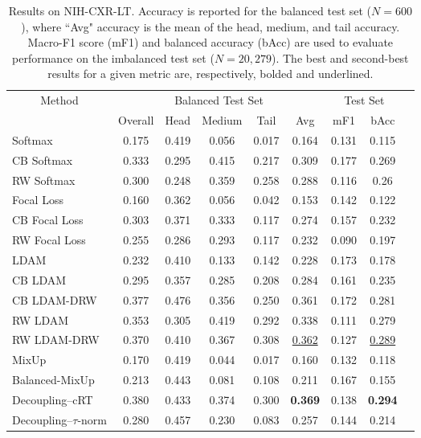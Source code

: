 \documentclass[runningheads]{llncs}
\begin{document}
\begin{table}[!hb]
    \centering
     \vspace{-1em}
	\renewcommand{\arraystretch}{1.1}
    \caption{Results on NIH-CXR-LT. Accuracy is reported for the balanced test set ($N=600$), where ``Avg" accuracy is the mean of the head, medium, and tail accuracy. Macro-F1 score (mF1) and balanced accuracy (bAcc) are used to evaluate performance on the imbalanced test set ($N=20,279$). The best and second-best results for a given metric are, respectively, bolded and underlined.}
    \begin{tabular}{@{}lcccccccc@{}}
        \toprule
        \multicolumn{1}{c}{Method} & \multicolumn{5}{c}{Balanced Test Set} & \multicolumn{2}{c}{Test Set} \\
        \cmidrule(lr){2-6} \cmidrule(lr){7-8}
         & Overall & Head & Medium & Tail & Avg & mF1 & bAcc \\
\midrule
        Softmax & 0.175 & 0.419 & 0.056 & 0.017 & 0.164 & 0.131 & 0.115 \\
        CB Softmax & 0.333 & 0.295 & 0.415 & 0.217 & 0.309 & 0.177 & 0.269 \\
        RW Softmax & 0.300 & 0.248 & 0.359 & 0.258 & 0.288 & 0.116 & 0.26 \\
        Focal Loss & 0.160 & 0.362 & 0.056 & 0.042 & 0.153 & 0.142 & 0.122 \\
        CB Focal Loss & 0.303 & 0.371 & 0.333 & 0.117 & 0.274 & 0.157 & 0.232 \\
        RW Focal Loss & 0.255 & 0.286 & 0.293 & 0.117 & 0.232 & 0.090 & 0.197 \\
        LDAM & 0.232 & 0.410 & 0.133 & 0.142 & 0.228 & 0.173 & 0.178 \\
        CB LDAM & 0.295 & 0.357 & 0.285 & 0.208 & 0.284 & 0.161 & 0.235 \\
        CB LDAM-DRW & 0.377 & 0.476 & 0.356 & 0.250 & 0.361 & 0.172 & 0.281 \\
        RW LDAM & 0.353 & 0.305 & 0.419 & 0.292 & 0.338 & 0.111 & 0.279 \\
        RW LDAM-DRW & 0.370 & 0.410 & 0.367 & 0.308 & \underline{0.362} & 0.127 & \underline{0.289} \\
        MixUp & 0.170 & 0.419 & 0.044 & 0.017 & 0.160 & 0.132 & 0.118 \\
        Balanced-MixUp & 0.213 & 0.443 & 0.081 & 0.108 & 0.211 & 0.167 & 0.155 \\
        Decoupling--cRT & 0.380 & 0.433 & 0.374 & 0.300 & \textbf{0.369} & 0.138 & \textbf{0.294} \\
        Decoupling--$\tau$-norm & 0.280 & 0.457 & 0.230 & 0.083 & 0.257 & 0.144 & 0.214 \\
\bottomrule
    \end{tabular}
    \label{results:nih}
\end{table}
\end{document}
